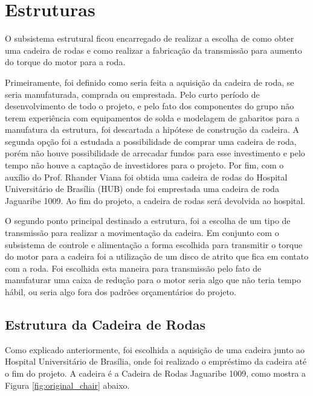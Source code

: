 \chapter{Estruturas}
\label{chapter:estruturas}

O subsistema estrutural ficou encarregado
de realizar a escolha de como obter uma cadeira de rodas e como realizar a fabricação da
transmissão para aumento do torque do motor para a roda.

Primeiramente, foi definido como seria feita a aquisição da cadeira de roda, se
seria manufaturada, comprada ou emprestada. Pelo curto período de
desenvolvimento de todo o projeto, e pelo fato dos componentes do grupo não
terem experiência com equipamentos de solda e modelagem de gabaritos para a
manufatura da estrutura, foi descartada a hipótese de construção da cadeira.
A segunda opção foi a estudada a possibilidade de comprar uma cadeira de roda,
porém não houve possibilidade de arrecadar fundos para esse investimento e pelo
tempo não houve a captação de investidores para o projeto. Por fim, com o
auxílio do Prof. Rhander Viana foi obtida uma cadeira de rodas do Hospital
Universitário de Brasília (HUB) onde foi emprestada uma cadeira de roda
Jaguaribe 1009. Ao fim do projeto, a cadeira de rodas será devolvida ao hospital.

O segundo ponto principal destinado a estrutura, foi a escolha de um tipo de
transmissão para realizar a movimentação da cadeira. Em conjunto com o
subsistema de controle e alimentação a forma escolhida para transmitir o torque do motor
para a cadeira foi a utilização de um disco de atrito que fica em contato com a
roda. Foi escolhida esta maneira para transmissão pelo fato de manufaturar uma
caixa de redução para o motor seria algo que não teria tempo hábil, ou seria
algo fora dos padrões orçamentários do projeto.

\section{Estrutura da Cadeira de Rodas}

Como explicado anteriormente, foi escolhida a aquisição de uma cadeira junto ao
Hospital Universitário de Brasília, onde foi realizado o empréstimo da cadeira
até o fim do projeto. A cadeira é a Cadeira de Rodas Jaguaribe 1009, como mostra
 a Figura \ref{fig:original_chair} abaixo.

